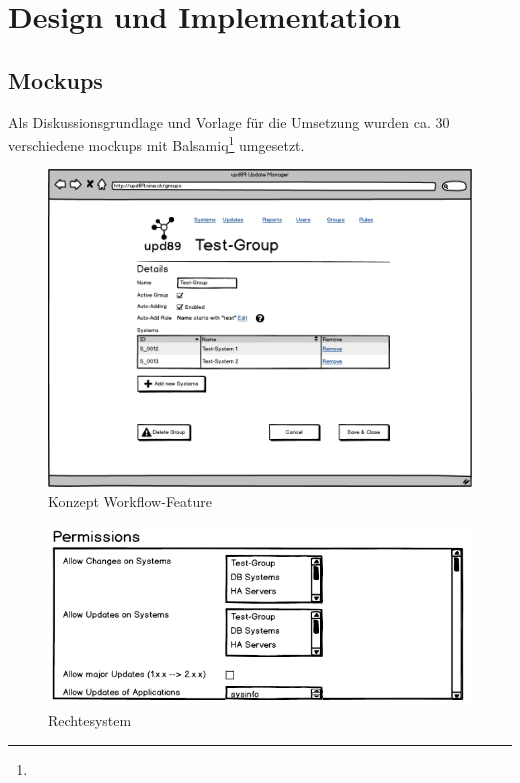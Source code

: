 \section{Design und Implementation}

\xxx

\subsection*{Mockups}

Als Diskussionsgrundlage und Vorlage für die Umsetzung wurden ca. 30 verschiedene \glspl{mockup} mit Balsamiq\footnote{} umgesetzt.

\begin{figure}[H]
	\centering
	\includegraphics[width=\linewidth]{files/mockups/group_systems}
	\caption{Konzept Workflow-Feature}
	\label{fig:design:group_users_mockup}
\end{figure}

\begin{figure}[H]
	\centering
	\includegraphics[width=\linewidth]{files/mockups/permission_1}
	\caption{Rechtesystem}
	\label{fig:design:permission_1}
\end{figure}

